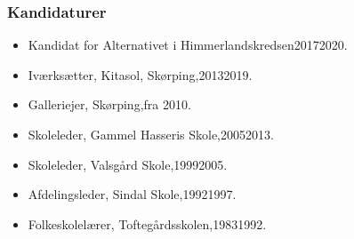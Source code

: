 \documentclass[11pt, a4paper]{awesome-cv}
\begin{document}
\begin{cvletter}
\subsubsection*{Kandidaturer}
\begin{itemize}
\item Kandidat for Alternativet i Himmerlandskredsen20172020.
\end{itemize}
\begin{itemize}
\item Iværksætter, Kitasol, Skørping,20132019.
\item Galleriejer, Skørping,fra 2010.
\item Skoleleder, Gammel Hasseris Skole,20052013.
\item Skoleleder, Valsgård Skole,19992005.
\item Afdelingsleder, Sindal Skole,19921997.
\item Folkeskolelærer, Toftegårdsskolen,19831992.
\end{itemize}
\end{cvletter}
\end{document}
